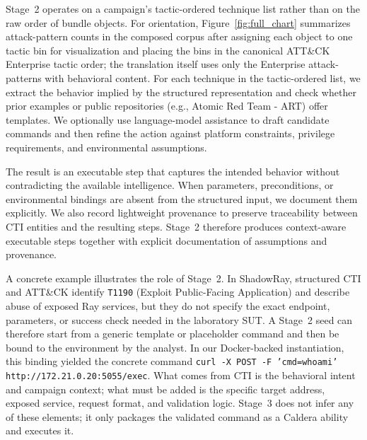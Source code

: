 \documentclass[sigconf]{acmart}
\newcommand{\attack}{ATT\&CK\xspace}
\newcommand{\caldera}{Caldera\xspace}
\begin{document}
Stage~2 operates on a campaign's tactic-ordered technique list rather than on the raw order of bundle objects. For orientation, Figure~\ref{fig:full_chart} summarizes attack-pattern counts in the composed corpus after assigning each object to one tactic bin for visualization and placing the bins in the canonical \attack{} Enterprise tactic order; the translation itself uses only the \nAttackPatternObjects{} Enterprise attack-patterns with behavioral content. For each technique in the tactic-ordered list, we extract the behavior implied by the structured representation and check whether prior examples or public repositories (e.g., Atomic Red Team - ART) offer templates. We optionally use language-model assistance to draft candidate commands and then refine the action against platform constraints, privilege requirements, and environmental assumptions.

The result is an executable step that captures the intended behavior without contradicting the available intelligence. When parameters, preconditions, or environmental bindings are absent from the structured input, we document them explicitly. We also record lightweight provenance to preserve traceability between CTI entities and the resulting steps. Stage~2 therefore produces context-aware executable steps together with explicit documentation of assumptions and provenance.

A concrete example illustrates the role of Stage~2. In ShadowRay, structured CTI and \attack{} identify \texttt{T1190} (Exploit Public-Facing Application) and describe abuse of exposed Ray services, but they do not specify the exact endpoint, parameters, or success check needed in the laboratory SUT. A Stage~2 seed can therefore start from a generic template or placeholder command and then be bound to the environment by the analyst. In our Docker-backed instantiation, this binding yielded the concrete command \texttt{curl -X POST -F 'cmd=whoami' http://172.21.0.20:5055/exec}. What comes from CTI is the behavioral intent and campaign context; what must be added is the specific target address, exposed service, request format, and validation logic. Stage~3 does not infer any of these elements; it only packages the validated command as a \caldera{} ability and executes it.
\end{document}
